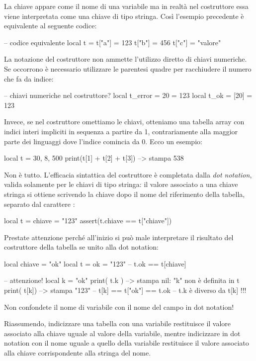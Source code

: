 La chiave appare come il nome di una variabile ma in realtà nel costruttore
essa viene interpretata come una chiave di tipo stringa. Così l'esempio
precedente è equivalente al seguente codice:
\begin{lines}
-- codice equivalente
local t = {}
t["a"] = 123
t["b"] = 456
t["c"] = "valore"
\end{lines}

La notazione del costruttore non ammette l'utilizzo diretto di chiavi
numeriche. Se occorrono è necessario utilizzare le parentesi quadre per
racchiudere il numero che fa da indice:
\begin{lines}
-- chiavi numeriche nel costruttore?
local t_error = { 20 = 123 }
local t_ok = { [20] = 123 }
\end{lines}

Invece, se nel costruttore omettiamo le chiavi, otteniamo una tabella array con
indici interi impliciti in sequenza a partire da 1, contrariamente alla maggior
parte dei linguaggi dove l'indice comincia da 0. Ecco un esempio:
\begin{lines}
local t = { 30, 8, 500 }
print(t[1] + t[2] + t[3]) --> stampa 538
\end{lines}

Non è tutto. L'efficacia sintattica del costruttore è completata dalla \emph{dot
notation}, valida solamente per le chiavi di tipo stringa: il valore associato a
una chiave stringa si ottiene scrivendo la chiave dopo il nome del riferimento
della tabella, separato dal carattere :
\begin{lines}
local t = { chiave = "123" }
assert(t.chiave == t["chiave"])
\end{lines}

Prestate attenzione perché all'inizio si può male interpretare il risultato del
costruttore della tabella se unito alla dot notation:
\begin{lines}
local chiave = "ok"
local t = { ok = "123"} -- t.ok == t[chiave]

-- attenzione!
local k = "ok"
print( t.k ) --> stampa nil: "k" non è definita in t
print( t[k]) --> stampa "123"
-- t[k] == t["ok"] == t.ok
-- t.k è diverso da t[k] !!!
\end{lines}

Non confondete il nome di variabile con il nome del campo in dot notation!

Riassumendo, indicizzare una tabella con una variabile restituisce il valore
associato alla chiave uguale al valore della variabile, mentre indicizzare in
dot notation con il nome uguale a quello della variabile restituisce il valore
associato alla chiave corrispondente alla stringa del nome.


